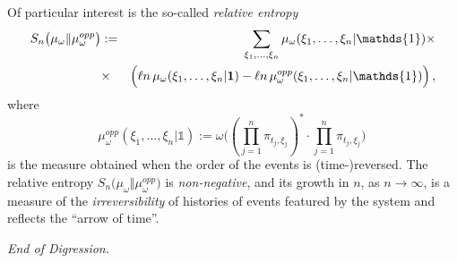 \documentclass[a4paper,11pt]{article}
\begin{document}
Of particular interest is the so-called \textit{relative entropy} 
\begin{eqnarray}\label{relentropy}
S_{n}\big(\mu_{\omega} \Vert \mu_{\omega}^{opp}\big)&:= &\sum_{\xi_1, \dots, \xi_{n}} \mu_{\omega}(\xi_1, \dots, \xi_{n}\vert {\mathds{1}}) \times \nonumber \\
&\times& \Big(\ell n  \,\mu_{\omega}(\xi_1, \dots, \xi_{n}\vert {\bf{1}}) - \ell n \, \mu_{\omega}^{opp}(\xi_1, \dots, \xi_{n}\vert {\mathds{1}}) \Big)\,,
\end{eqnarray}
where
$$\mu_{\omega}^{opp}(\xi_1, \dots, \xi_n \vert {\mathds{1}}) := \omega\Big((\prod_{j=1}^{n} \pi_{t_j, \xi_j})^{*}\cdot \prod_{j=1}^{n}\pi_{t_j, \xi_j}\Big)\,$$
is the measure obtained when the order of the events is (time-)reversed. The relative entropy $S_{n}\big(\mu_{\omega} \Vert \mu_{\omega}^{opp}\big)$ is \textit{non-negative}, and its growth in $n$, as $n \rightarrow \infty$, is a measure of the \textit{irreversibility} of histories of events featured by the system and reflects the ``arrow of time''.

 \textit{End of Digression.}
\end{document}
